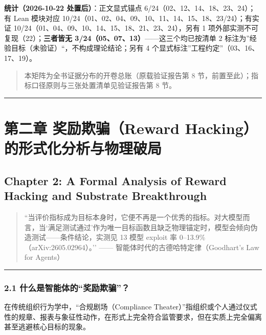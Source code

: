 \documentclass[
]{ctexart}
\renewcommand{\_}{\discretionary{}{}{\textunderscore}}
\let\oldsection\section
\renewcommand{\section}{\clearpage\oldsection}
\begin{document}
\textbf{统计（2026-10-22 处置后）}：正文显式锚点
6/24（02、12、14、18、23、24）；有 Lean 模块对应
10/24（01、02、04、09、10、11、14、15、18、23/24）；有实证
10/24（01、04、09、10、14、15、18、21、23、24），另有 1
项外部实测不可复现（22）；\textbf{三者皆无
3/24（05、07、13）}------这三个均已按清单 2
标注为''经验目标（未验证）``，不构成理论结论；另有 4
个显式标注''工程约定''（03、16、17、19）。

\begin{quote}
本矩阵为全书证据分布的开卷总账（原载验证报告第 8
节，前置至此）；指标口径原则与三张处置清单见验证报告第 8 节。
\end{quote}

\begin{center}\rule{0.5\linewidth}{0.5pt}\end{center}

\section{第二章 奖励欺骗（Reward
Hacking）的形式化分析与物理破局}\label{ux7b2cux4e8cux7ae0-ux5956ux52b1ux6b3aux9a97reward-hackingux7684ux5f62ux5f0fux5316ux5206ux6790ux4e0eux7269ux7406ux7834ux5c40}

\subsection{Chapter 2: A Formal Analysis of Reward Hacking and Substrate
Breakthrough}\label{chapter-2-a-formal-analysis-of-reward-hacking-and-substrate-breakthrough}

\begin{quote}
``当评价指标成为目标本身时，它便不再是一个优秀的指标。对大模型而言，当`满足测试通过'作为唯一目标函数且缺乏物理锚定时，模型会倾向伪造测试------条件结论，实测见
13 模型 exploit 率 0--13.9\%（arXiv:2605.02964）。'' ------
智能体时代的古德哈特定律（Goodhart's Law for Agents）
\end{quote}

\begin{center}\rule{0.5\linewidth}{0.5pt}\end{center}

\subsubsection{2.1
什么是智能体的``奖励欺骗''？}\label{ux4ec0ux4e48ux662fux667aux80fdux4f53ux7684ux5956ux52b1ux6b3aux9a97}

在传统组织行为学中，``合规剧场（Compliance
Theater）''指组织或个人通过仪式性的规章、报表与象征性动作，在形式上完全符合监管要求，但在实质上完全偏离甚至逃避核心目标的现象。
\end{document}
